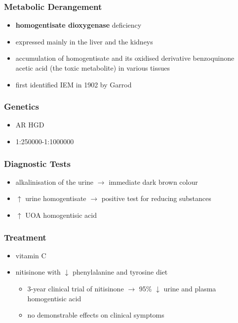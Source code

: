 \documentclass[12pt]{scrartcl}
\begin{document}
\subsubsection{Metabolic Derangement}
\label{sec:orgba64b59}
\begin{itemize}
\item \textbf{homogentisate dioxygenase} deficiency
\end{itemize}

\begin{itemize}
\item expressed mainly in the liver and the kidneys
\item accumulation of homogentisate and its oxidised derivative
benzoquinone acetic acid (the toxic metabolite) in various tissues
\item first identified IEM in 1902 by Garrod
\end{itemize}

\subsubsection{Genetics}
\label{sec:org9e0a336}
\begin{itemize}
\item AR HGD
\item 1:250000-1:1000000
\end{itemize}
\subsubsection{Diagnostic Tests}
\label{sec:orgc58aa76}
\begin{itemize}
\item alkalinisation of the urine \(\to\) immediate dark brown colour
\item \(\uparrow\) urine homogentisate \(\to\) positive test for reducing substances
\item \(\uparrow\) UOA homogentisic acid
\end{itemize}
\subsubsection{Treatment}
\label{sec:org39b1958}
\begin{itemize}
\item vitamin C
\item nitisinone with \(\downarrow\) phenylalanine and tyrosine diet
\begin{itemize}
\item 3-year clinical trial of nitisinone \(\to\) 95\% \(\downarrow\) urine and plasma homogentisic acid
\item no demonstrable effects on clinical symptoms
\end{itemize}
\end{itemize}
\end{document}
